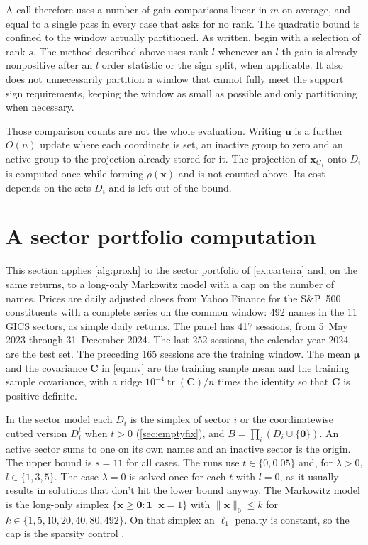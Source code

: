 \documentclass[11pt,a4paper]{article}
\theoremstyle{plain}
\theoremstyle{definition}
\theoremstyle{remark}
\newcommand*{\vz}{\mathbf{0}}
\newcommand*\x{\mathbf{x}}
\newcommand*\U{\mathbf{u}}
\begin{document}
A call therefore uses a number of gain comparisons linear in \(m\) on average, and equal to a single pass in every case that asks for no rank.
The quadratic bound is confined to the window actually partitioned.
As written,  begin with a selection of rank \(s\).
The method described above uses rank \(l\) whenever an \(l\)-th gain is already nonpositive after an \(l\) order statistic or the sign split, when applicable.
It also does not unnecessarily partition a window that cannot fully meet the support sign requirements, keeping the window as small as possible and only partitioning when necessary.

Those comparison counts are not the whole evaluation.
Writing \(\U\) is a further \(O(n)\) update where each coordinate is set, an inactive group to zero and an active group to the projection already stored for it.
The projection of \(\x_{G_i}\) onto \(D_i\) is computed once while forming \(\rho(\x)\) and is not counted above.
Its cost depends on the sets \(D_i\) and is left out of the bound.

\section{A sector portfolio computation}
\label{sec:numerics}

This section applies \cref{alg:proxh} to the sector portfolio of \cref{ex:carteira} and, on the same returns, to a long-only Markowitz model with a cap on the number of names.
Prices are daily adjusted closes from Yahoo Finance for the S\&P~500 constituents with a complete series on the common window: 492 names in the 11 GICS sectors, as simple daily returns.
The panel has 417 sessions, from 5~May 2023 through 31~December 2024.
The last 252 sessions, the calendar year 2024, are the test set.
The preceding 165 sessions are the training window.
The mean \(\boldsymbol{\mu}\) and the covariance \(\mathbf{C}\) in \eqref{eq:mv} are the training sample mean and the training sample covariance, with a ridge \(10^{-4}\operatorname{tr}(\mathbf{C})/n\) times the identity so that \(\mathbf{C}\) is positive definite.

In the sector model each \(D_i\) is the simplex of sector \(i\) or the coordinatewise cutted version \(D_i^t\) when \(t>0\) (\cref{sec:emptyfix}), and \(B=\prod_i(D_i\cup\{\vz\})\).
An active sector sums to one on its own names and an inactive sector is the origin.
The upper bound is \(s=11\) for all cases.
The runs use \(t\in\{0,0.05\}\) and, for \(\lambda>0\), \(l\in\{1,3,5\}\).
The case \(\lambda=0\) is solved once for each \(t\) with \(l=0\), as it usually results in solutions that don't hit the lower bound anyway.
The Markowitz model is the long-only simplex \(\{\x\ge\vz:\mathbf{1}^\top\x=1\}\) with \(\|\x\|_0\le k\) for \(k\in\{1,5,10,20,40,80,492\}\).
On that simplex an \(\ell_1\) penalty is constant, so the cap is the sparsity control \cite{brodie2009}.
\end{document}
